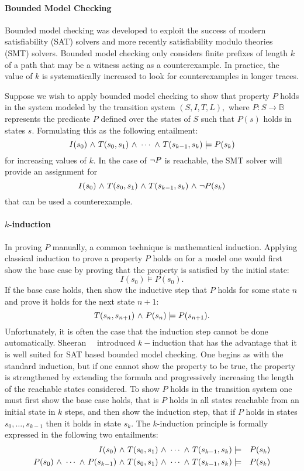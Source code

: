 \paragraph{Bounded Model Checking} Bounded model checking was developed to exploit the success of modern
satisfiability (SAT) solvers and more recently satisfiability modulo
theories (SMT) solvers. Bounded model checking only considers finite
prefixes of length $k$  of a path that may be a witness acting as a
counterexample. In practice, the value of $k$ is systematically
increased to look for counterexamples in longer traces.  

  
Suppose we wish to apply bounded model checking to show that property
$P$ holds in  the system modeled by the transition
system $(S,I,T,L),$ where $P: S \rightarrow \mathbb{B}$ represents
the predicate $P$ defined over the states of $S$ such that $P(s)$
holds in states $s.$
Formulating this as the following entailment:
$$ I(s_0) {\ \wedge \ } T(s_0,s_1) {\ \wedge \ } \cdots {\ \wedge \ } T(s_{k-1},s_k)
\models P(s_k)$$
for increasing values of $k.$ In the case of ${\neg} P$ is reachable,
the SMT solver will provide an assignment for 
$$I(s_0) {\ \wedge \ } T(s_0,s_1) {\ \wedge \ } T(s_{k-1},s_k) {\ \wedge \ } {\neg}
P(s_k)$$
that can be used a counterexample. 

\paragraph{$k$-induction}  In proving $P$ manually, a common technique
is mathematical induction.  Applying classical induction to prove a
property $P$ holds on  for a model one would first show the base case
by proving that the property is satisfied by the initial state:
$$I(s_0) \models P(s_0).$$
If the base case holds, then show the inductive step that $P$ holds
for some state $n$ and prove it holds for the next state $n+1:$
$$ T(s_{n},s_{n+1}) {\ \wedge \ } P(s_n) \models P(s_{n+1}).$$
Unfortunately, it is often the case that the induction step cannot be
done automatically.  Sheeran~\etal~\cite{Sheeran00, EenS03} introduced
$k-$induction that has the advantage that it is well suited for SAT
based bounded model checking.  One begins as with the standard
induction, but if one cannot show the property to be true, the
property is strengthened by extending the formula and
progressively increasing the length of the reachable states
considered.  To show $P$ holds in the transition system one must first
show the base case holds, that is $P$ holds in all states reachable
from an initial state in $k$ steps, and then show the induction step,
that if $P$ holds in states $s_0,\ldots,s_{k-1}$ then it holds in
state $s_k.$ The $k$-induction principle is formally expressed in the
following two entailments:
\begin{eqnarray*}
I(s_0) {\ \wedge \ } T(s_0,s_1) {\ \wedge \ } \cdots {\ \wedge \ } T(s_{k-1},s_k) &\models&
P(s_k) \\
P(s_0) {\ \wedge \ } \cdots {\ \wedge \ } P(s_{k-1}) {\ \wedge \ } T(s_0,s_1) {\ \wedge \ } \cdots {\ \wedge \ } T(s_{k-1},s_k) &\models&
P(s_k) 
\end{eqnarray*} 

